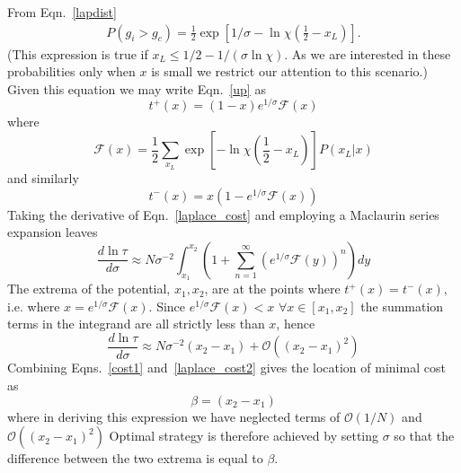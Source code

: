 \documentclass[aps,prl,twocolumn,showpacs,superscriptaddress,groupedaddress]{revtex4}
\begin{document}
From Eqn.~\ref{lapdist}
\begin{align}
P\left(g_i>g_c \right) =
\frac{1}{2}\exp{\left[1/\sigma - \ln\chi  \left(\frac{1}{2}-x_L\right)\right] }.%
\end{align}
(This expression is true if $x_L \le 1/2 - 1/(\sigma\ln\chi)$. As we are interested in these probabilities only when $x$ is small we restrict our attention to this scenario.) Given this equation we may write Eqn.~\ref{up} as
\begin{equation}
t^+(x) = (1-x)  e^{1/\sigma } \mathcal{F}(x)
\end{equation}
where 
\begin{equation}
 \mathcal{F}(x) = \frac{1}{2}\sum_{x_{L}}\exp{\left[ - \ln\chi  \left(\frac{1}{2}-x_L\right)\right]}P\left(x_{L}|x\right)
\end{equation}
and similarly 
\begin{equation}
t^-(x) =x \left(1-  e^{1/\sigma } \mathcal{F}(x)\right)
\end{equation}
Taking the derivative of Eqn.~\ref{laplace_cost} and employing a Maclaurin series expansion leaves
\begin{equation}
  \frac{d \ln \tau}{d \sigma} \approx N \sigma^{-2} \int_{x_1}^{x_2} \left(1 + \sum_{n=1}^{\infty} \left(e^{1/\sigma } \mathcal{F}(y)\right)^n  \right) dy
\label{laplace_cost2}
\end{equation}
The extrema of the potential, $x_1,x_2$, are at the points where $t^+(x)=t^-(x)$, i.e. where $x=e^{1/\sigma } \mathcal{F}(x)$. Since $e^{1/\sigma } \mathcal{F}(x)<x$ $\forall x \in [x_1,x_2]$ the summation terms in the integrand are all strictly less than $x$, hence
\begin{equation}
  \frac{d \ln \tau}{d \sigma} \approx  N \sigma^{-2} \left({x_2}-{x_1}\right) + \mathcal{O}\left( \left(x_2-x_1\right)^2\right)
\label{laplace_cost2}
\end{equation}
Combining Eqns.~\ref{cost1} and~\ref{laplace_cost2} gives the location of minimal cost as
\begin{equation}
  \beta =  \left({x_2}-{x_1}\right) 
\label{laplace_cost_final}
\end{equation}
where in deriving this expression we have neglected terms of $\mathcal{O}(1/N)$ and $\mathcal{O}\left( \left(x_2-x_1\right)^2\right)$
Optimal strategy is therefore achieved by setting $\sigma$ so that the difference between the two extrema is equal to $\beta$.
\end{document}
